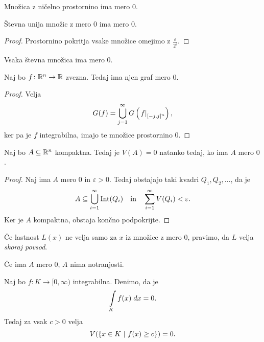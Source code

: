 \begin{opomba}
Množica z ničelno prostornino ima mero $0$.
\end{opomba}

\begin{trditev}
Števna unija množic z mero $0$ ima mero $0$.
\end{trditev}

\begin{proof}
Prostornino pokritja vsake množice omejimo z
$\frac{\varepsilon}{2^i}$.
\end{proof}

\begin{posledica}
Vsaka števna množica ima mero $0$.
\end{posledica}

\begin{posledica}
Naj bo $f \colon \mathbb{R}^n \to \mathbb{R}$ zvezna. Tedaj ima njen graf mero $0$.
\end{posledica}

\begin{proof}
Velja
\[
G(f) = \bigcup_{j=1}^\infty G\left(\left. f\right|_{[-j,j]^n}^{}\right),
\]
ker pa je $f$ integrabilna, imajo te množice prostornino $0$.
\end{proof}

\begin{trditev}
Naj bo $A \subseteq \mathbb{R}^n$ kompaktna. Tedaj je $V(A) = 0$ natanko
tedaj, ko ima $A$ mero $0$.
\end{trditev}

\begin{proof}
Naj ima $A$ mero $0$ in $\varepsilon > 0$. Tedaj obstajajo taki
kvadri $Q_1,Q_2,\dots$, da je
\[
A \subseteq \bigcup_{i=1}^\infty \operatorname{Int}(Q_i)
\quad \text{in} \quad
\sum_{i=1}^\infty V(Q_i) < \varepsilon.
\]
Ker je $A$ kompaktna, obstaja končno podpokrijte.
\end{proof}

\begin{definicija}
Če lastnost $L(x)$ ne velja samo za $x$ iz množice z mero $0$,
pravimo, da $L$ velja \emph{skoraj povsod}.
\end{definicija}

\begin{opomba}
Če ima $A$ mero $0$, $A$ nima notranjosti.
\end{opomba}

\begin{lema}
Naj bo $f \colon K \to [0,\infty)$ integrabilna. Denimo, da je
\[
\int\limits_K f(x)\;dx = 0.
\]
Tedaj za vsak $c > 0$ velja
\[
V(\left\{x \in K~\middle\vert~f(x) \geq c\right\}) = 0.
\]
\end{lema}

